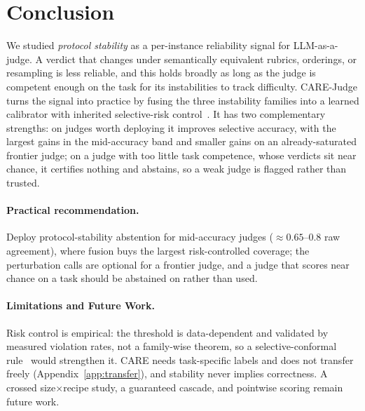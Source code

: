 
\section{Conclusion}
\label{sec:conclusion}

We studied \emph{protocol stability} as a per-instance reliability signal for LLM-as-a-judge. A verdict that changes under semantically equivalent rubrics, orderings, or resampling is less reliable, and this holds broadly as long as the judge is competent enough on the task for its instabilities to track difficulty. CARE-Judge turns the signal into practice by fusing the three instability families into a learned calibrator with inherited selective-risk control~\citep{jung2025trust,badshah2026scope}. It has two complementary strengths: on judges worth deploying it improves selective accuracy, with the largest gains in the mid-accuracy band and smaller gains on an already-saturated frontier judge; on a judge with too little task competence, whose verdicts sit near chance, it certifies nothing and abstains, so a weak judge is flagged rather than trusted.

\paragraph{Practical recommendation.}
Deploy protocol-stability abstention for mid-accuracy judges ($\approx0.65$--$0.8$ raw agreement), where fusion buys the largest risk-controlled coverage; the perturbation calls are optional for a frontier judge, and a judge that scores near chance on a task should be abstained on rather than used.

\paragraph{Limitations and Future Work.}
Risk control is empirical: the threshold is data-dependent and validated by measured violation rates, not a family-wise theorem, so a selective-conformal rule~\citep{xu2025selective,bao2024cap} would strengthen it. CARE needs task-specific labels and does not transfer freely (Appendix~\ref{app:transfer}), and stability never implies correctness. A crossed size$\times$recipe study, a guaranteed cascade, and pointwise scoring remain future work.
